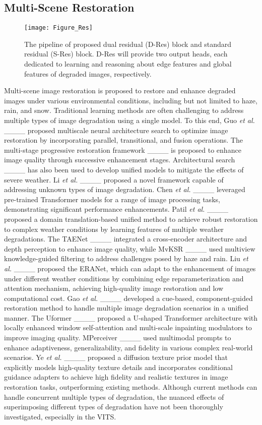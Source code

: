 \subsection{Multi-Scene Restoration}
%
    \begin{figure*}[t]
        \centering
        \setlength{\abovecaptionskip}{0.cm}
        \texttt{[image: Figure\_Res]}
        \caption{The pipeline of proposed dual residual (D-Res) block and standard residual (S-Res) block. D-Res will provide two output heads, each dedicated to learning and reasoning about edge features and global features of degraded images, respectively.}
        \label{Figure_Res}
    \end{figure*}
    Multi-scene image restoration is proposed to restore and enhance degraded images under various environmental conditions, including but not limited to haze, rain, and snow. Traditional learning methods are often challenging to address multiple types of image degradation using a single model. To this end, Guo \textit{et al.} ____ proposed multiscale neural architecture search to optimize image restoration by incorporating parallel, transitional, and fusion operations. The multi-stage progressive restoration framework ____ is proposed to enhance image quality through successive enhancement stages. Architectural search ____ has also been used to develop unified models to mitigate the effects of severe weather. Li \textit{et al.} ____ proposed a novel framework capable of addressing unknown types of image degradation. Chen \textit{et al.} ____ leveraged pre-trained Transformer models for a range of image processing tasks, demonstrating significant performance enhancements. Patil \textit{et al.} ____ proposed a domain translation-based unified method to achieve robust restoration to complex weather conditions by learning features of multiple weather degradations. The TAENet ____ integrated a cross-encoder architecture and depth perception to enhance image quality, while MvKSR ____ used multiview knowledge-guided filtering to address challenges posed by haze and rain. Liu \textit{et al.} ____ proposed the ERANet, which can adapt to the enhancement of images under different weather conditions by combining edge reparameterization and attention mechanism, achieving high-quality image restoration and low computational cost. Gao \textit{et al.} ____ developed a cue-based, component-guided restoration method to handle multiple image degradation scenarios in a unified manner. The Uformer ____ proposed a U-shaped Transformer architecture with locally enhanced window self-attention and multi-scale inpainting modulators to improve imaging quality. MPerceiver ____ used multimodal prompts to enhance adaptiveness, generalizability, and fidelity in various complex real-world scenarios. Ye \textit{et al.} ____ proposed a diffusion texture prior model that explicitly models high-quality texture details and incorporates conditional guidance adapters to achieve high fidelity and realistic textures in image restoration tasks, outperforming existing methods. Although current methods can handle concurrent multiple types of degradation, the nuanced effects of superimposing different types of degradation have not been thoroughly investigated, especially in the VITS.
%